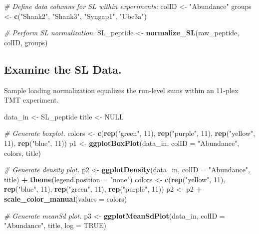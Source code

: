 \documentclass[]{article}
\newenvironment{Shaded}{\begin{snugshade}}{\end{snugshade}}
\newcommand{\KeywordTok}[1]{\textcolor[rgb]{0.13,0.29,0.53}{\textbf{#1}}}
\newcommand{\DataTypeTok}[1]{\textcolor[rgb]{0.13,0.29,0.53}{#1}}
\newcommand{\DecValTok}[1]{\textcolor[rgb]{0.00,0.00,0.81}{#1}}
\newcommand{\StringTok}[1]{\textcolor[rgb]{0.31,0.60,0.02}{#1}}
\newcommand{\CommentTok}[1]{\textcolor[rgb]{0.56,0.35,0.01}{\textit{#1}}}
\newcommand{\OtherTok}[1]{\textcolor[rgb]{0.56,0.35,0.01}{#1}}
\newcommand{\OperatorTok}[1]{\textcolor[rgb]{0.81,0.36,0.00}{\textbf{#1}}}
\newcommand{\NormalTok}[1]{#1}
\begin{document}
\begin{Shaded}
\begin{Highlighting}[]
\CommentTok{# Define data columns for SL within experiments:}
\NormalTok{colID <-}\StringTok{ "Abundance"}
\NormalTok{groups <-}\StringTok{ }\KeywordTok{c}\NormalTok{(}\StringTok{"Shank2"}\NormalTok{, }\StringTok{"Shank3"}\NormalTok{, }\StringTok{"Syngap1"}\NormalTok{, }\StringTok{"Ube3a"}\NormalTok{)}

\CommentTok{# Perform SL normalization.}
\NormalTok{SL_peptide <-}\StringTok{ }\KeywordTok{normalize_SL}\NormalTok{(raw_peptide, colID, groups)}
\end{Highlighting}
\end{Shaded}

\subsection{Examine the SL Data.}\label{examine-the-sl-data.}

Sample loading normalization equalizes the run-level sums within an
11-plex TMT experiment.

\begin{Shaded}
\begin{Highlighting}[]
\NormalTok{data_in <-}\StringTok{ }\NormalTok{SL_peptide}
\NormalTok{title <-}\StringTok{ }\OtherTok{NULL}

\CommentTok{# Generate boxplot.}
\NormalTok{colors <-}\StringTok{ }\KeywordTok{c}\NormalTok{(}\KeywordTok{rep}\NormalTok{(}\StringTok{"green"}\NormalTok{, }\DecValTok{11}\NormalTok{), }\KeywordTok{rep}\NormalTok{(}\StringTok{"purple"}\NormalTok{, }\DecValTok{11}\NormalTok{), }\KeywordTok{rep}\NormalTok{(}\StringTok{"yellow"}\NormalTok{, }\DecValTok{11}\NormalTok{), }\KeywordTok{rep}\NormalTok{(}\StringTok{"blue"}\NormalTok{, }\DecValTok{11}\NormalTok{))}
\NormalTok{p1 <-}\StringTok{ }\KeywordTok{ggplotBoxPlot}\NormalTok{(data_in, }\DataTypeTok{colID =} \StringTok{"Abundance"}\NormalTok{, colors, title)}

\CommentTok{# Generate density plot.}
\NormalTok{p2 <-}\StringTok{ }\KeywordTok{ggplotDensity}\NormalTok{(data_in, }\DataTypeTok{colID =} \StringTok{"Abundance"}\NormalTok{, title) }\OperatorTok{+}\StringTok{ }\KeywordTok{theme}\NormalTok{(}\DataTypeTok{legend.position =} \StringTok{"none"}\NormalTok{)}
\NormalTok{colors <-}\StringTok{ }\KeywordTok{c}\NormalTok{(}\KeywordTok{rep}\NormalTok{(}\StringTok{"yellow"}\NormalTok{, }\DecValTok{11}\NormalTok{), }\KeywordTok{rep}\NormalTok{(}\StringTok{"blue"}\NormalTok{, }\DecValTok{11}\NormalTok{), }\KeywordTok{rep}\NormalTok{(}\StringTok{"green"}\NormalTok{, }\DecValTok{11}\NormalTok{), }\KeywordTok{rep}\NormalTok{(}\StringTok{"purple"}\NormalTok{, }\DecValTok{11}\NormalTok{))}
\NormalTok{p2 <-}\StringTok{ }\NormalTok{p2 }\OperatorTok{+}\StringTok{ }\KeywordTok{scale_color_manual}\NormalTok{(}\DataTypeTok{values =}\NormalTok{ colors)}

\CommentTok{# Generate meanSd plot.}
\NormalTok{p3 <-}\StringTok{ }\KeywordTok{ggplotMeanSdPlot}\NormalTok{(data_in, }\DataTypeTok{colID =} \StringTok{"Abundance"}\NormalTok{, title, }\DataTypeTok{log =} \OtherTok{TRUE}\NormalTok{)}
\end{Highlighting}
\end{Shaded}
\end{document}
